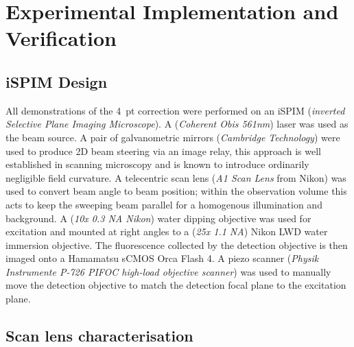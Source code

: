\fi
\section{Experimental Implementation and Verification}
\subsection{iSPIM Design}
All demonstrations of the 4~pt correction were performed on an iSPIM (\emph{inverted Selective Plane Imaging Microscope}).
A (\emph{Coherent Obis 561nm}) laser was used as the beam source.
A pair of galvanometric mirrors (\emph{Cambridge Technology}) were used to produce 2D beam steering via an image relay, this approach is well established in scanning microscopy and is known to introduce ordinarily negligible field curvature.
A telecentric scan lens (\emph{A1 Scan Lens} from Nikon) was used to convert beam angle to beam position; %
within the observation volume this acts to keep the sweeping beam parallel for a homogenous illumination and background.
A (\emph{10x 0.3 NA Nikon}) water dipping objective was used for excitation and mounted at right angles to a (\emph{25x 1.1 NA}) Nikon LWD water immersion objective.
The fluorescence collected by the detection objective is then imaged onto a Hamamatsu sCMOS Orca Flash 4.
A piezo scanner (\emph{Physik Instrumente P-726 PIFOC high-load objective scanner}) was used to manually move the detection objective to match the detection focal plane to the excitation plane.


\subsection{Scan lens characterisation}

